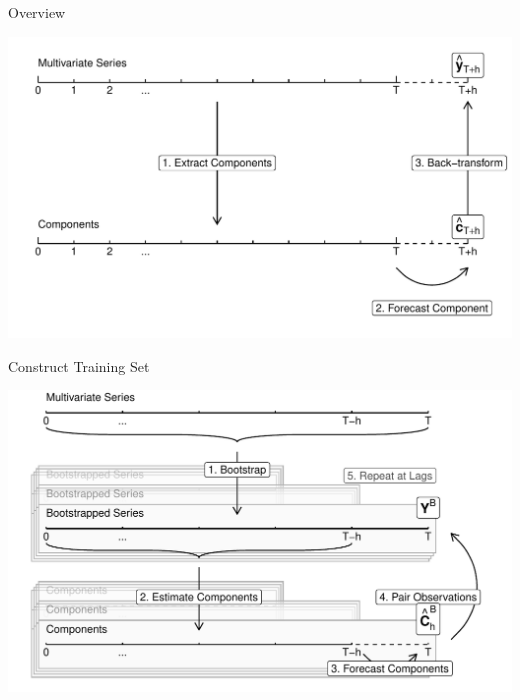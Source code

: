 \documentclass[14pt,ignorenonframetext,]{beamer}
\begin{document}
\begin{frame}{Overview}
\protect\hypertarget{overview-3}{}
\centerline{
\includegraphics[width=\linewidth]{plot/p_timeline_notation}
}
\end{frame}

\begin{frame}{Construct Training Set}
\protect\hypertarget{construct-training-set-1}{}
\begin{center}
\includegraphics[width=\linewidth]{plot/p_backtransform_notation}
\end{center}
\end{frame}
\end{document}
